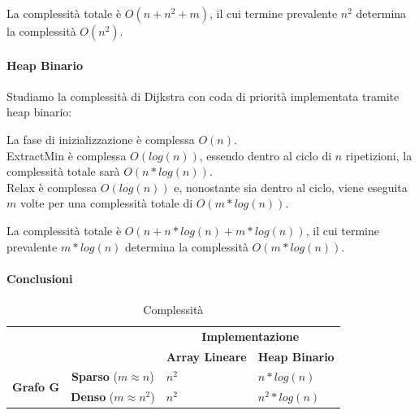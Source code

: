 \documentclass[11pt,a4paper,twoside,openright]{book}
\let\oldparagraph\paragraph
\renewcommand{\paragraph}[1]{\oldparagraph{#1}\mbox{}}
\begin{document}
{{La complessità totale è $O(n+n^2+m)$, il cui termine prevalente $n^2$ determina la complessità $O(n^2)$.

\paragraph{Heap Binario}

{Studiamo la complessità di Dijkstra con coda di priorità implementata tramite heap binario:}

La fase di inizializzazione è complessa $O(n)$. \\
ExtractMin è complessa $O(log(n))$, essendo dentro al ciclo di $n$ ripetizioni, la complessità totale sarà $O(n*log(n))$. \\
Relax è complessa $O(log(n))$ e, nonostante sia dentro al ciclo, viene eseguita $m$ volte per una complessità totale di $O(m*log(n))$.

La complessità totale è $O(n+n*log(n)+m*log(n))$, il cui termine prevalente $m*log(n)$ determina la complessità $O(m*log(n))$.

\paragraph{Conclusioni}

\begin{table}[h]
\centering
\caption{Complessità}
\begin{tabular}{ll|l|l|}
\cline{3-4}
                                                        &                                      & \multicolumn{2}{c|}{\textbf{Implementazione}}                                            \\ \cline{3-4} 
                                                        &                                      & \multicolumn{1}{c|}{\textbf{Array Lineare}} & \multicolumn{1}{c|}{\textbf{Heap Binario}} \\ \hline
\multicolumn{1}{|c|}{\multirow{2}{*}{\textbf{Grafo G}}} & \multicolumn{1}{c|}{\textbf{Sparso} ($m \approx n$)} & $n^2$                                         & $n*log(n)$                                        \\ \cline{2-4} 
\multicolumn{1}{|c|}{}                                  & \multicolumn{1}{c|}{\textbf{Denso}  ($m \approx n^2$)}  & $n^2$                                         & $n^2*log(n)$                                                                               \\ \hline
\end{tabular}
\end{table}

}}
\end{document}
